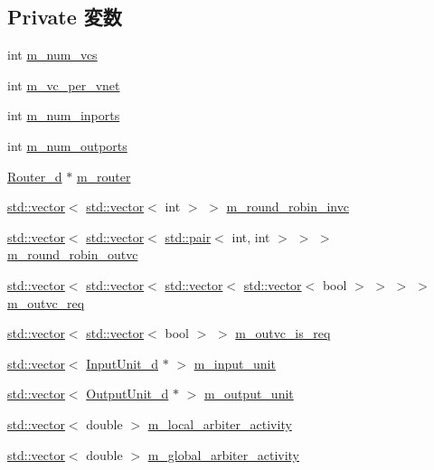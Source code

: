 \subsection*{Private 変数}
\begin{DoxyCompactItemize}
\item 
int \hyperlink{classVCallocator__d_a2e1a9213321dfa0386cdedaf6fc22996}{m\_\-num\_\-vcs}
\item 
int \hyperlink{classVCallocator__d_a2d66b8cad5144408ed492eeff4d37c2f}{m\_\-vc\_\-per\_\-vnet}
\item 
int \hyperlink{classVCallocator__d_a260af5f608c447554a07e3d62bf6b9f7}{m\_\-num\_\-inports}
\item 
int \hyperlink{classVCallocator__d_ae83c00a45968faba20d5c3bc92891fee}{m\_\-num\_\-outports}
\item 
\hyperlink{classRouter__d}{Router\_\-d} $\ast$ \hyperlink{classVCallocator__d_a81d53a65b375007289068e764da769d8}{m\_\-router}
\item 
\hyperlink{classstd_1_1vector}{std::vector}$<$ \hyperlink{classstd_1_1vector}{std::vector}$<$ int $>$ $>$ \hyperlink{classVCallocator__d_a831d6cd1f4d45e61a10ab72187b33d5c}{m\_\-round\_\-robin\_\-invc}
\item 
\hyperlink{classstd_1_1vector}{std::vector}$<$ \hyperlink{classstd_1_1vector}{std::vector}$<$ \hyperlink{classstd_1_1pair}{std::pair}$<$ int, int $>$ $>$ $>$ \hyperlink{classVCallocator__d_a3242844a3a1fcc8d060e0fc43684ddb0}{m\_\-round\_\-robin\_\-outvc}
\item 
\hyperlink{classstd_1_1vector}{std::vector}$<$ \hyperlink{classstd_1_1vector}{std::vector}$<$ \hyperlink{classstd_1_1vector}{std::vector}$<$ \hyperlink{classstd_1_1vector}{std::vector}$<$ bool $>$ $>$ $>$ $>$ \hyperlink{classVCallocator__d_a565c44d4e130274c6c0f138f46436556}{m\_\-outvc\_\-req}
\item 
\hyperlink{classstd_1_1vector}{std::vector}$<$ \hyperlink{classstd_1_1vector}{std::vector}$<$ bool $>$ $>$ \hyperlink{classVCallocator__d_afb9d0344d4f274a64e63a4801587c497}{m\_\-outvc\_\-is\_\-req}
\item 
\hyperlink{classstd_1_1vector}{std::vector}$<$ \hyperlink{classInputUnit__d}{InputUnit\_\-d} $\ast$ $>$ \hyperlink{classVCallocator__d_a474451572c5e5813250c2f17ac3ec986}{m\_\-input\_\-unit}
\item 
\hyperlink{classstd_1_1vector}{std::vector}$<$ \hyperlink{classOutputUnit__d}{OutputUnit\_\-d} $\ast$ $>$ \hyperlink{classVCallocator__d_ab8b34c9f5479c61b8022de1aad185bae}{m\_\-output\_\-unit}
\item 
\hyperlink{classstd_1_1vector}{std::vector}$<$ double $>$ \hyperlink{classVCallocator__d_a507c247979821ca8ce56bc84a8d9872a}{m\_\-local\_\-arbiter\_\-activity}
\item 
\hyperlink{classstd_1_1vector}{std::vector}$<$ double $>$ \hyperlink{classVCallocator__d_a62bae8bf542cca6471d776c27eeadc06}{m\_\-global\_\-arbiter\_\-activity}
\end{DoxyCompactItemize}


